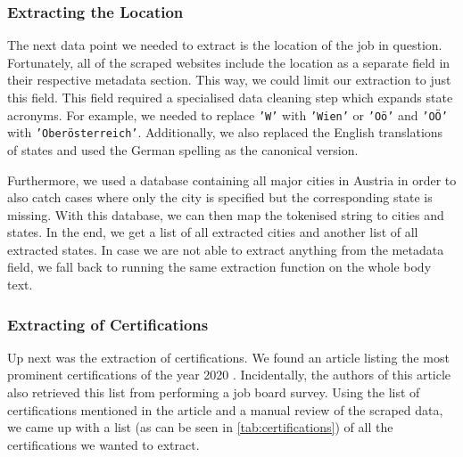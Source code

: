 \documentclass[runningheads]{llncs}
\begin{document}
\subsubsection{Extracting the Location}
\label{subsub:extracting_the_location}

The next data point we needed to extract is the location of the job in question. Fortunately, all of the scraped websites include the location as a separate field in their respective metadata section. This way, we could limit our extraction to just this field. This field required a specialised data cleaning step which expands state acronyms. For example, we needed to replace \texttt{'W'} with \texttt{'Wien'} or \texttt{'Oö'} and \texttt{'OÖ'} with \texttt{'Oberösterreich'}. Additionally, we also replaced the English translations of states and used the German spelling as the canonical version.

Furthermore, we used a database containing all major cities in Austria \cite{austria_cities_database} in order to also catch cases where only the city is specified but the corresponding state is missing. With this database, we can then map the tokenised string to cities and states. In the end, we get a list of all extracted cities and another list of all extracted states. In case we are not able to extract anything from the metadata field, we fall back to running the same extraction function on the whole body text.

\subsubsection{Extracting of Certifications}
\label{subsub:extracting_of_certifications}

Up next was the extraction of certifications. We found an article listing the most prominent certifications of the year 2020 \cite{certifications}. Incidentally, the authors of this article also retrieved this list from performing a job board survey. Using the list of certifications mentioned in the article and a manual review of the scraped data, we came up with a list (as can be seen in \autoref{tab:certifications}) of all the certifications we wanted to extract.
\end{document}
